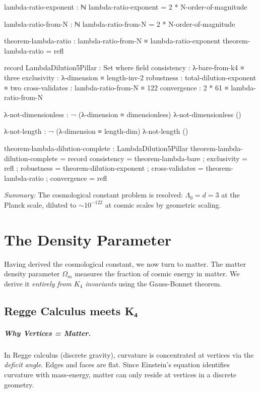 \documentclass[11pt,a4paper]{book}
\begin{document}
\begin{code}
  lambda-ratio-exponent : ℕ
  lambda-ratio-exponent = 2 * N-order-of-magnitude
  
  lambda-ratio-from-N : ℕ
  lambda-ratio-from-N = 2 * N-order-of-magnitude
  
  theorem-lambda-ratio : lambda-ratio-from-N ≡ lambda-ratio-exponent
  theorem-lambda-ratio = refl
  
  record LambdaDilution5Pillar : Set where
    field
      consistency     : λ-bare-from-k4 ≡ three
      exclusivity     : λ-dimension ≡ length-inv-2
      robustness      : total-dilution-exponent ≡ two
      cross-validates : lambda-ratio-from-N ≡ 122
      convergence     : 2 * 61 ≡ lambda-ratio-from-N
  
  λ-not-dimensionless : ¬ (λ-dimension ≡ dimensionless)
  λ-not-dimensionless ()
  
  λ-not-length : ¬ (λ-dimension ≡ length-dim)
  λ-not-length ()
      
  theorem-lambda-dilution-complete : LambdaDilution5Pillar
  theorem-lambda-dilution-complete = record
    { consistency     = theorem-lambda-bare
    ; exclusivity     = refl
    ; robustness      = theorem-dilution-exponent
    ; cross-validates = theorem-lambda-ratio
    ; convergence     = refl
    }
\end{code}

\medskip
\noindent\textit{Summary:} The cosmological constant problem is resolved: $\Lambda_0 = d = 3$ 
at the Planck scale, diluted to $\sim 10^{-122}$ at cosmic scales by geometric scaling.

\chapter{The Density Parameter}
\label{chap:matter-density-geometry}

Having derived the cosmological constant, we now turn to matter. The matter density 
parameter $\Omega_m$ measures the fraction of cosmic energy in matter. We derive it 
\emph{entirely from $K_4$ invariants} using the Gauss-Bonnet theorem.

\section{Regge Calculus meets K₄}

\paragraph{Why Vertices = Matter.}
In Regge calculus (discrete gravity), curvature is concentrated at vertices via the 
\emph{deficit angle}. Edges and faces are flat. Since Einstein's equation identifies 
curvature with mass-energy, matter can only reside at vertices in a discrete geometry.
\end{document}
